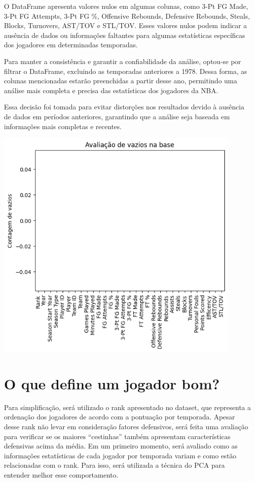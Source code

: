 \documentclass[
]{book}
\begin{document}
O DataFrame apresenta valores nulos em algumas colunas, como 3-Pt FG Made, 3-Pt FG Attempts, 3-Pt FG \%, Offensive Rebounds, Defensive Rebounds, Steals, Blocks, Turnovers, AST/TOV e STL/TOV. Esses valores nulos podem indicar a ausência de dados ou informações faltantes para algumas estatísticas específicas dos jogadores em determinadas temporadas.

Para manter a consistência e garantir a confiabilidade da análise, optou-se por filtrar o DataFrame, excluindo as temporadas anteriores a 1978. Dessa forma, as colunas mencionadas estarão preenchidas a partir desse ano, permitindo uma análise mais completa e precisa das estatísticas dos jogadores da NBA.

Essa decisão foi tomada para evitar distorções nos resultados devido à ausência de dados em períodos anteriores, garantindo que a análise seja baseada em informações mais completas e recentes.

\includegraphics[width=0.9\textwidth,height=\textheight]{imagens/2.png}

\hypertarget{o-que-define-um-jogador-bom}{%
\chapter{O que define um jogador bom?}\label{o-que-define-um-jogador-bom}}

Para simplificação, será utilizado o rank apresentado no dataset, que representa a ordenação dos jogadores de acordo com a pontuação por temporada. Apesar desse rank não levar em consideração fatores defensivos, será feita uma avaliação para verificar se os maiores ``cestinhas'' também apresentam características defensivas acima da média. Em um primeiro momento, será avaliado como as informações estatísticas de cada jogador por temporada variam e como estão relacionadas com o rank. Para isso, será utilizada a técnica do PCA para entender melhor esse comportamento.
\end{document}
